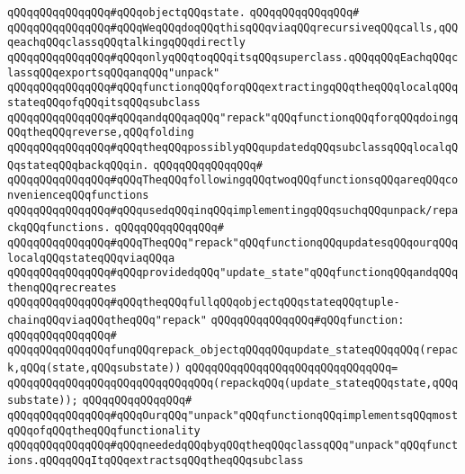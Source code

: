 \verb|qQQqqQQqqQQqqQQq#qQQqobjectqQQqstate.|\newline
\verb|qQQqqQQqqQQqqQQq#|\newline
\verb|qQQqqQQqqQQqqQQq#qQQqWeqQQqdoqQQqthisqQQqviaqQQqrecursiveqQQqcalls,qQQqeachqQQqclassqQQqtalkingqQQqdirectly|\newline
\verb|qQQqqQQqqQQqqQQq#qQQqonlyqQQqtoqQQqitsqQQqsuperclass.qQQqqQQqEachqQQqclassqQQqexportsqQQqanqQQq"unpack"|\newline
\verb|qQQqqQQqqQQqqQQq#qQQqfunctionqQQqforqQQqextractingqQQqtheqQQqlocalqQQqstateqQQqofqQQqitsqQQqsubclass|\newline
\verb|qQQqqQQqqQQqqQQq#qQQqandqQQqaqQQq"repack"qQQqfunctionqQQqforqQQqdoingqQQqtheqQQqreverse,qQQqfolding|\newline
\verb|qQQqqQQqqQQqqQQq#qQQqtheqQQqpossiblyqQQqupdatedqQQqsubclassqQQqlocalqQQqstateqQQqbackqQQqin.|\newline
\verb|qQQqqQQqqQQqqQQq#|\newline
\verb|qQQqqQQqqQQqqQQq#qQQqTheqQQqfollowingqQQqtwoqQQqfunctionsqQQqareqQQqconvenienceqQQqfunctions|\newline
\verb|qQQqqQQqqQQqqQQq#qQQqusedqQQqinqQQqimplementingqQQqsuchqQQqunpack/repackqQQqfunctions.|\newline
\verb|qQQqqQQqqQQqqQQq#|\newline
\verb|qQQqqQQqqQQqqQQq#qQQqTheqQQq"repack"qQQqfunctionqQQqupdatesqQQqourqQQqlocalqQQqstateqQQqviaqQQqa|\newline
\verb|qQQqqQQqqQQqqQQq#qQQqprovidedqQQq"update_state"qQQqfunctionqQQqandqQQqthenqQQqrecreates|\newline
\verb|qQQqqQQqqQQqqQQq#qQQqtheqQQqfullqQQqobjectqQQqstateqQQqtuple-chainqQQqviaqQQqtheqQQq"repack"|\newline
\verb|qQQqqQQqqQQqqQQq#qQQqfunction:|\newline
\verb|qQQqqQQqqQQqqQQq#|\newline
\verb|qQQqqQQqqQQqqQQqfunqQQqrepack_objectqQQqqQQqupdate_stateqQQqqQQq(repack,qQQq(state,qQQqsubstate))|\newline
\verb|qQQqqQQqqQQqqQQqqQQqqQQqqQQqqQQq=|\newline
\verb|qQQqqQQqqQQqqQQqqQQqqQQqqQQqqQQq(repackqQQq(update_stateqQQqstate,qQQqsubstate));|\newline
\verb|qQQqqQQqqQQqqQQq#|\newline
\verb|qQQqqQQqqQQqqQQq#qQQqOurqQQq"unpack"qQQqfunctionqQQqimplementsqQQqmostqQQqofqQQqtheqQQqfunctionality|\newline
\verb|qQQqqQQqqQQqqQQq#qQQqneededqQQqbyqQQqtheqQQqclassqQQq"unpack"qQQqfunctions.qQQqqQQqItqQQqextractsqQQqtheqQQqsubclass|\newline
